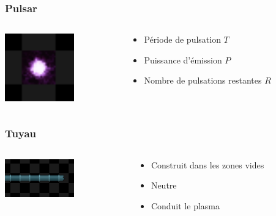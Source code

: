 \documentclass{beamer}
\begin{document}
\begin{frame}
	\frametitle{Pulsar}
    \begin{columns}[T]
        \begin{column}{.3\textwidth}
            \includegraphics[width=3cm]{pictures/pulsar}
        \end{column}
        \begin{column}{.7\textwidth}
            \begin{itemize}
                \item Période de pulsation $T$
                \item Puissance d'émission $P$
                \item Nombre de pulsations restantes $R$
            \end{itemize}
        \end{column}
    \end{columns}
\end{frame}

\begin{frame}
	\frametitle{Tuyau}
    \begin{columns}[T]
        \begin{column}{.3\textwidth}
            \includegraphics[width=3cm]{pictures/tuyau}
        \end{column}
        \begin{column}{.7\textwidth}
            \begin{itemize}
                \item Construit dans les zones vides
                \item Neutre
                \item Conduit le plasma
            \end{itemize}
        \end{column}
    \end{columns}
\end{frame}
\end{document}
